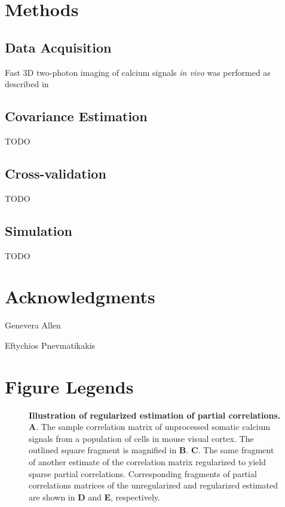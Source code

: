 \documentclass[10pt]{article}
\begin{document}
\section*{Methods}
\subsection*{Data Acquisition}
Fast 3D two-photon imaging of calcium signals \emph{in vivo} was performed as described in \cite{Cotton:2013}
\subsection*{Covariance Estimation}
TODO
\subsection*{Cross-validation}
TODO
\subsection*{Simulation}
TODO

\section*{Acknowledgments}
Genevera Allen

Eftychios Pnevmatikakis 




\section*{Figure Legends}

\begin{figure}[!ht]
    \begin{center}
    \end{center}
    \caption{{\bf Illustration of regularized estimation of partial correlations.}
        {\bf A}. The sample correlation matrix of unprocessed somatic calcium signals from a population of cells in mouse visual cortex.
        The outlined square fragment is magnified in {\bf B}.
        {\bf C}. The same fragment of another estimate of the correlation matrix regularized to yield sparse partial correlations.
        Corresponding fragments of partial correlations matrices of the unregularized and regularized estimated are shown in {\bf D} and {\bf E}, respectively.
    }
    \label{fig:01}
\end{figure}
\end{document}
